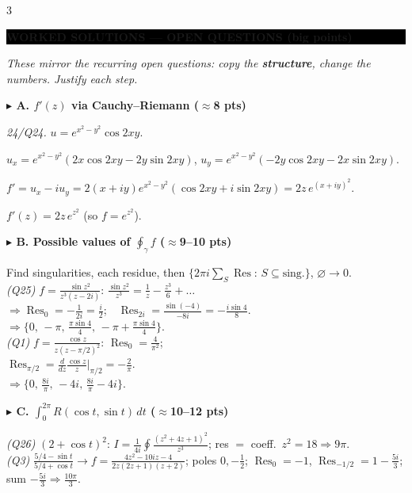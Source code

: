 \documentclass[a4paper,8pt]{extarticle}
\newcommand{\topic}[2]{%
  \vspace{4.5pt}%
  {\colorbox{#1}{\parbox{\dimexpr\columnwidth-2\fboxsep}{\color{white}\bfseries\footnotesize #2}}}\par\vspace{2.5pt}}
\newcommand{\Res}{\operatorname{Res}}
\newcommand{\half}{\tfrac12}
\newcommand{\To}{\!\to\!}
\begin{document}
\begin{multicols}{3}
\topic{black}{WORKED SOLUTIONS — OPEN QUESTIONS (big points)}
{\itshape These mirror the recurring open questions: copy the \textbf{structure}, change the numbers. Justify each step.}\par\smallskip

\textbf{\textcolor{cA}{$\blacktriangleright$ A. $f'(z)$ via Cauchy--Riemann ($\approx$8 pts)}}\par
\emph{24/Q24.} $u=e^{x^2-y^2}\cos2xy$.
\begin{recipe}
\item $u_x=e^{x^2-y^2}(2x\cos2xy-2y\sin2xy)$, $u_y=e^{x^2-y^2}(-2y\cos2xy-2x\sin2xy)$.
\item $f'=u_x-iu_y=2(x{+}iy)e^{x^2-y^2}(\cos2xy+i\sin2xy)=2z\,e^{(x+iy)^2}$.
\end{recipe}
$\boxed{f'(z)=2z\,e^{z^2}}$ (so $f=e^{z^2}$).
\smallskip

\textbf{\textcolor{cA}{$\blacktriangleright$ B. Possible values of $\oint_\gamma f$ ($\approx$9--10 pts)}}\par
Find singularities, each residue, then $\{2\pi i\sum_S\Res:\,S\subseteq\text{sing.}\}$, $\varnothing\To0$.\\
\emph{(Q25)} $f{=}\frac{\sin z^2}{z^3(z-2i)}$: $\frac{\sin z^2}{z^3}{=}\frac1z{-}\frac{z^3}6{+}\dots$\\
$\Rightarrow\Res_0{=}{-}\frac1{2i}{=}\frac i2$;\ \ $\Res_{2i}{=}\frac{\sin(-4)}{-8i}{=}{-}\frac{i\sin4}8$.\\
$\Rightarrow\boxed{\{0,\,{-}\pi,\,\tfrac{\pi\sin4}4,\,{-}\pi{+}\tfrac{\pi\sin4}4\}}$.\\[2pt]
\emph{(Q1)} $f{=}\frac{\cos z}{z(z-\pi/2)^2}$: $\Res_0{=}\frac4{\pi^2}$;\\ $\Res_{\pi/2}{=}\frac{d}{dz}\frac{\cos z}z\big|_{\pi/2}{=}{-}\frac2\pi$.\\
$\Rightarrow\boxed{\{0,\,\tfrac{8i}\pi,\,{-}4i,\,\tfrac{8i}\pi{-}4i\}}$.
\smallskip

\textbf{\textcolor{cA}{$\blacktriangleright$ C. $\int_0^{2\pi}R(\cos t,\sin t)\,dt$ ($\approx$10--12 pts)}}\par
\emph{(Q26)} $(2{+}\cos t)^2$: $I{=}\frac1{4i}\oint\frac{(z^2+4z+1)^2}{z^3}$; res $=$ coeff.\ $z^2{=}18\Rightarrow\boxed{9\pi}$.\\
\emph{(Q3)} $\frac{5/4-\sin t}{5/4+\cos t}\To f{=}\frac{4z^2-10iz-4}{2z(2z+1)(z+2)}$; poles $0,{-}\half$; $\Res_0{=}{-}1$, $\Res_{-1/2}{=}1{-}\frac{5i}3$; sum ${-}\frac{5i}3\Rightarrow\boxed{\frac{10\pi}3}$.
\smallskip


\end{multicols}
\end{document}
